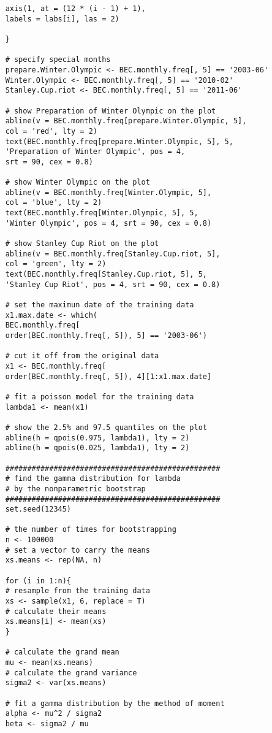 \documentclass[12pt]{article}
\begin{document}
\begin{enumerate}
\begin{verbatim}
	axis(1, at = (12 * (i - 1) + 1), 
	labels = labs[i], las = 2)
	
	}
	
	# specify special months
	prepare.Winter.Olympic <- BEC.monthly.freq[, 5] == '2003-06'
	Winter.Olympic <- BEC.monthly.freq[, 5] == '2010-02'
	Stanley.Cup.riot <- BEC.monthly.freq[, 5] == '2011-06'
	
	# show Preparation of Winter Olympic on the plot
	abline(v = BEC.monthly.freq[prepare.Winter.Olympic, 5], 
	col = 'red', lty = 2)
	text(BEC.monthly.freq[prepare.Winter.Olympic, 5], 5, 
	'Preparation of Winter Olympic', pos = 4, 
	srt = 90, cex = 0.8)
	
	# show Winter Olympic on the plot 
	abline(v = BEC.monthly.freq[Winter.Olympic, 5], 
	col = 'blue', lty = 2)
	text(BEC.monthly.freq[Winter.Olympic, 5], 5, 
	'Winter Olympic', pos = 4, srt = 90, cex = 0.8)
	
	# show Stanley Cup Riot on the plot 
	abline(v = BEC.monthly.freq[Stanley.Cup.riot, 5], 
	col = 'green', lty = 2)
	text(BEC.monthly.freq[Stanley.Cup.riot, 5], 5, 
	'Stanley Cup Riot', pos = 4, srt = 90, cex = 0.8)
	
	# set the maximun date of the training data
	x1.max.date <- which(
	BEC.monthly.freq[
	order(BEC.monthly.freq[, 5]), 5] == '2003-06')
	
	# cut it off from the original data
	x1 <- BEC.monthly.freq[
	order(BEC.monthly.freq[, 5]), 4][1:x1.max.date]
	
	# fit a poisson model for the training data
	lambda1 <- mean(x1)
	
	# show the 2.5% and 97.5 quantiles on the plot
	abline(h = qpois(0.975, lambda1), lty = 2)
	abline(h = qpois(0.025, lambda1), lty = 2)
	
	#################################################
	# find the gamma distribution for lambda 
	# by the nonparametric bootstrap
	#################################################
	set.seed(12345)
	
	# the number of times for bootstrapping
	n <- 100000
	# set a vector to carry the means
	xs.means <- rep(NA, n)
	
	for (i in 1:n){
	# resample from the training data
	xs <- sample(x1, 6, replace = T)
	# calculate their means
	xs.means[i] <- mean(xs)
	}
	
	# calculate the grand mean
	mu <- mean(xs.means)
	# calculate the grand variance
	sigma2 <- var(xs.means)
	
	# fit a gamma distribution by the method of moment
	alpha <- mu^2 / sigma2
	beta <- sigma2 / mu
	

\end{verbatim}
\end{enumerate}
\end{document}
